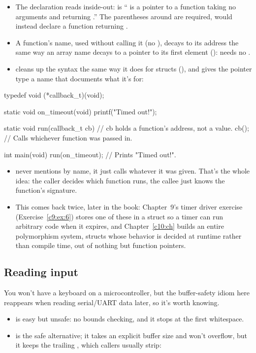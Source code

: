 \begin{itemize}
  \item The declaration reads inside-out:  is `` is a pointer to a
    function taking no arguments and returning .'' The parentheses around  are
    required,  would instead declare a function returning .
  \item A function's name, used without calling it (no \code{()}), decays to its address the same
    way an array name decays to a pointer to its first element ():
     needs no \code{&}.
  \item {} cleans up the syntax the same way it does for structs (), and
    gives the pointer type a name that documents what it's for:
\end{itemize}

\begin{ccode}
typedef void (*callback_t)(void);

static void on_timeout(void) { printf("Timed out!\n"); }

static void run(callback_t cb) // cb holds a function's address, not a value.
{
    cb(); // Calls whichever function was passed in.
}

int main(void)
{
    run(on_timeout); // Prints "Timed out!".
}
\end{ccode}

\begin{itemize}
  \item {} never mentions  by name, it just calls whatever
     it was given. That's the whole idea: the caller decides which function runs,
    the callee just knows the function's signature.
  \item This comes back twice, later in the book: Chapter~9's timer driver exercise
    (Exercise~\ref{c9:ex:6}) stores one of these in a struct so a timer can run arbitrary code when
    it expires, and Chapter~\ref{c10:ch} builds an entire polymorphism system, structs whose
    behavior is decided at runtime rather than compile time, out of nothing but function pointers.
\end{itemize}

\subsection{Reading input}
\label{c1:a:9}
You won't have a keyboard on a microcontroller, but the buffer-safety idiom here reappears when
reading serial/UART data later, so it's worth knowing.
\begin{itemize}
  \item {} is easy but unsafe: no bounds checking, and it stops at the first
    whitespace.
  \item {} is the safe alternative; it takes an explicit buffer
    size and won't overflow, but it keeps the trailing , which callers usually strip:
\end{itemize}


